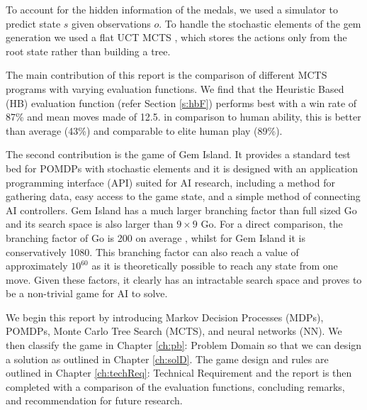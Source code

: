 \documentclass{bhamthesis}
\theoremstyle{definition}
\begin{document}
To account for the hidden information of the medals, we used a simulator to predict state $s$ given observations $o$. To handle the stochastic elements of the gem generation we used a flat UCT MCTS \cite{Browne2012}, which stores the actions only from the root state rather than building a tree. 

The main contribution of this report is the comparison of different MCTS programs with varying evaluation functions. We find that the Heuristic Based (HB) evaluation function (refer Section \ref{s:hbF}) performs best with a win rate of 87\% and mean moves made of 12.5. in comparison to human ability, this is better than average (43\%) and comparable to elite human play (89\%).

The second contribution is the game of Gem Island. It provides a standard test bed for POMDPs with stochastic elements and it is designed with an application programming interface (API) suited for AI research, including a method for gathering data, easy access to the game state, and a simple method of connecting AI controllers. Gem Island has a much larger branching factor than full sized Go and its search space is also larger than $9 \times 9$ Go. For a direct comparison, the branching factor of Go is 200 on average \cite{Gelly2006}, whilst for Gem Island it is conservatively 1080. This branching factor can also reach a value of approximately $10^{60}$ as it is theoretically possible to reach any state from one move. Given these factors, it clearly has an intractable search space and proves to be a non-trivial game for AI to solve.

We begin this report by introducing Markov Decision Processes (MDPs), POMDPs, Monte Carlo Tree Search (MCTS), and neural networks (NN). We then classify the game in Chapter \ref{ch:pb}: Problem Domain so that we can design a solution as outlined in Chapter \ref{ch:solD}. The game design and rules are outlined in Chapter \ref{ch:techReq}: Technical Requirement and the report is then completed with a comparison of the evaluation functions, concluding remarks, and recommendation for future research.
\end{document}
